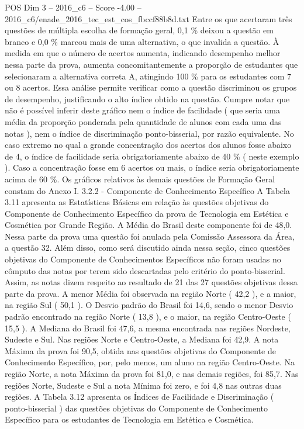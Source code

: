 \begin{textsample}{POS Dim 3 – 2016\_c6 – Score -4.00 – 2016\_c6/enade\_2016\_tec\_est\_cos\_fbccf88b8d.txt}
Entre os que acertaram três questões de múltipla escolha de formação geral, 0,1 \% deixou a questão em branco e 0,0 \% marcou mais de uma alternativa, o que invalida a questão.
À medida em que o número de acertos aumenta, indicando desempenho melhor nessa parte da prova, aumenta concomitantemente a proporção de estudantes que selecionaram a alternativa correta A, atingindo 100 \% para os estudantes com 7 ou 8 acertos.
Essa análise permite verificar como a questão discriminou os grupos de desempenho, justificando o alto índice obtido na questão.
Cumpre notar que não é possível inferir deste gráfico nem o índice de facilidade ( que seria uma média da proporção ponderada pela quantidade de alunos com cada uma das notas ), nem o índice de discriminação ponto-bisserial, por razão equivalente.
No caso extremo no qual a grande concentração dos acertos dos alunos fosse abaixo de 4, o índice de facilidade seria obrigatoriamente abaixo de 40 \% ( neste exemplo ).
Caso a concentração fosse em 6 acertos ou mais, o índice seria obrigatoriamente acima de 60 \%.
Os gráficos relativos às demais questões de Formação Geral constam do Anexo I. 3.2.2 - Componente de Conhecimento Específico A Tabela 3.11 apresenta as Estatísticas Básicas em relação às questões objetivas do Componente de Conhecimento Específico da prova de Tecnologia em Estética e Cosmética por Grande Região.
A Média do Brasil deste componente foi de 48,0.
Nessa parte da prova uma questão foi anulada pela Comissão Assessora da Área, a questão 32.
Além disso, como será discutido ainda nessa seção, cinco questões objetivas do Componente de Conhecimentos Específicos não foram usadas no cômputo das notas por terem sido descartadas pelo critério do ponto-bisserial.
Assim, as notas dizem respeito ao resultado de 21 das 27 questões objetivas dessa parte da prova.
A menor Média foi observada na região Norte ( 42,2 ), e a maior, na região Sul ( 50,1 ).
O Desvio padrão do Brasil foi 14,6, sendo o menor Desvio padrão encontrado na região Norte ( 13,8 ), e o maior, na região Centro-Oeste ( 15,5 ).
A Mediana do Brasil foi 47,6, a mesma encontrada nas regiões Nordeste, Sudeste e Sul.
Nas regiões Norte e Centro-Oeste, a Mediana foi 42,9.
A nota Máxima da prova foi 90,5, obtida nas questões objetivas do Componente de Conhecimento Específico, por, pelo menos, um aluno na região Centro-Oeste.
Na região Norte, a nota Máxima da prova foi 81,0, e nas demais regiões, foi 85,7.
Nas regiões Norte, Sudeste e Sul a nota Mínima foi zero, e foi 4,8 nas outras duas regiões.
A Tabela 3.12 apresenta os Índices de Facilidade e Discriminação ( ponto-bisserial ) das questões objetivas do Componente de Conhecimento Específico para os estudantes de Tecnologia em Estética e Cosmética.

\end{textsample}
